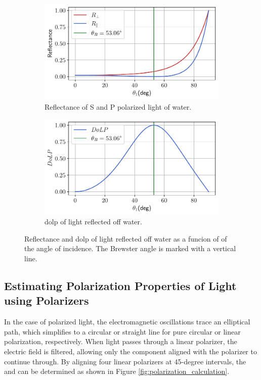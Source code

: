 \begin{figure}[H]
    \centering
    \begin{subfigure}{.5\textwidth}
        \centering
        \includegraphics[width=\textwidth]{figures/pol_plots/brewster0.pdf}
        \caption{Reflectance of S and P polarized light of water.}
        \label{fig:brewster0}
    \end{subfigure}%
    \begin{subfigure}{.5\textwidth}
        \centering
        \includegraphics[width=\textwidth]{figures/pol_plots/brewster1.pdf}
        \caption{\gls{dolp} of light reflected off water.}
        \label{fig:brewster1}
    \end{subfigure}
    \caption{Reflectance and \gls{dolp} of light reflected off water as a funcion of of the angle of incidence.
        The Brewster angle is marked with a vertical line.}
    \label{fig:test}
\end{figure}




\subsection{Estimating Polarization Properties of Light using Polarizers}
In the case of polarized light, the electromagnetic oscillations trace an elliptical path, which simplifies to a circular or straight line for pure circular or linear polarization, respectively.
When light passes through a linear polarizer, the electric field is filtered, allowing only the component aligned with the polarizer to continue through.
By aligning four linear polarizers at 45-degree intervals, the  and  can be determined as shown in Figure \ref{fig:polarization_calculation}.

